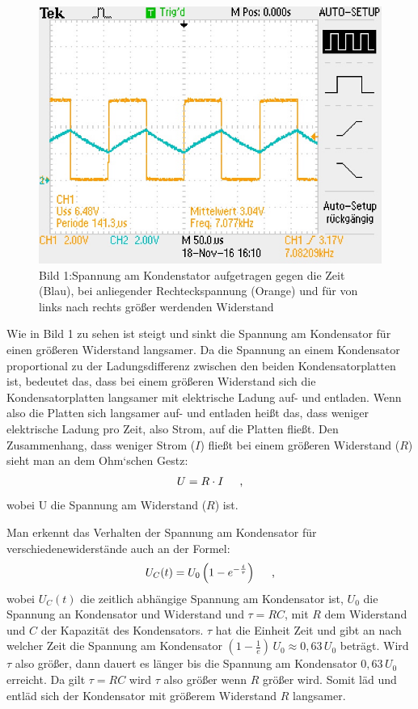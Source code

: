 \begin{figure}[t]
    \begin{minipage}[t]{0.32\linewidth}
        \centering
        \includegraphics[width=\linewidth]{F0002TEK.jpg}
    \end{minipage}
    \caption*{Bild 1:\small Spannung am Kondenstator aufgetragen gegen die Zeit (Blau), bei anliegender Rechteckspannung (Orange) und für von links nach rechts größer werdenden Widerstand}
\end{figure}


Wie in Bild 1 zu sehen ist steigt und sinkt die Spannung am Kondensator für einen größeren Widerstand langsamer. Da die Spannung an einem Kondensator proportional zu der Ladungsdifferenz zwischen den beiden Kondensatorplatten ist, bedeutet das, dass bei einem größeren Widerstand sich die Kondensatorplatten
langsamer mit elektrische Ladung auf- und entladen. Wenn also die Platten sich langsamer auf- und entladen heißt das, dass weniger elektrische Ladung pro Zeit, also Strom, auf die Platten fließt. Den Zusammenhang, dass weniger Strom ($I$) fließt bei einem größeren Widerstand ($R$) sieht man an dem  Ohm`schen Gestz:
\begin{align}
    U=R\cdot I \text{\hspace{0.5cm},}
\end{align}
wobei U die Spannung am Widerstand ($R$) ist.

Man erkennt das Verhalten der Spannung am Kondensator für verschiedenewiderstände auch an der Formel:
\begin{align}
    U_C(t)=U_0 \left( 1-e^{-\frac{t}{\tau}} \right)\text{\hspace{0.5cm},}
\end{align}
wobei $U_C(t)$ die zeitlich abhängige Spannung am Kondensator ist, $U_0$ die Spannung an Kondensator und Widerstand und $\tau=RC$, mit $R$ dem Widerstand und $C$ der Kapazität des Kondensators. $\tau$ hat die Einheit Zeit und gibt an nach welcher Zeit die Spannung am Kondensator $\left(1-\frac{1}{e}\right)\,U_0\approx0,63\,U_0$ beträgt. Wird $\tau$ also größer, dann dauert es länger bis die Spannung am Kondensator $0,63\,U_0$ erreicht. Da gilt $\tau=RC$ wird $\tau$ also größer wenn $R$ größer wird. Somit läd und entläd sich der Kondensator mit größerem Widerstand $R$ langsamer.

